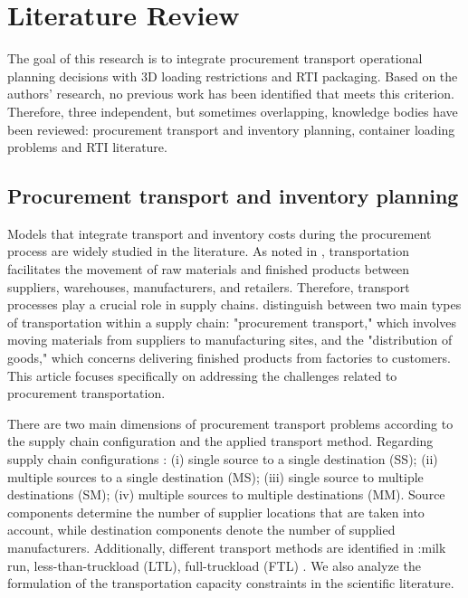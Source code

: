 \section{Literature Review}
\label{sec:lit}

The goal of this research is to integrate procurement transport operational planning decisions with 3D loading restrictions and RTI packaging. Based on the authors’ research, no previous work has been identified that meets this criterion. Therefore, three independent, but sometimes overlapping, knowledge bodies have been reviewed: procurement transport and inventory planning, container loading problems and RTI literature.

\subsection{Procurement transport and inventory planning}

Models that integrate transport and inventory costs during the procurement process are widely studied in the literature. As noted in \autocite{Langley2020SupplyPerspective}, transportation facilitates the movement of raw materials and finished products between suppliers,  warehouses, manufacturers, and retailers. Therefore, transport processes play a crucial role in supply chains. \autocite{Fleischmann2015TransportDistribution} distinguish between two main types of transportation within a supply chain: "procurement transport," which involves moving materials from suppliers to manufacturing sites, and the "distribution of goods," which concerns delivering finished products from factories to customers. This article focuses specifically on addressing the challenges related to procurement transportation.

There are two main dimensions of procurement transport problems according to the supply chain configuration and the applied transport method. Regarding supply chain configurations \autocite{Mosca2019IntegratedReview}: (i) single source to a single destination (SS); (ii) multiple sources to a single destination (MS);
(iii) single source to multiple destinations (SM); (iv) multiple sources to multiple destinations (MM). Source components determine the number of supplier locations that are taken into account, while destination components denote the number of supplied manufacturers. Additionally, different transport methods are identified in \autocite{Diaz-Madronero2014AChain}:milk run, less-than-truckload (LTL),  full-truckload (FTL) . We also analyze the formulation of the transportation capacity constraints in the scientific literature.


